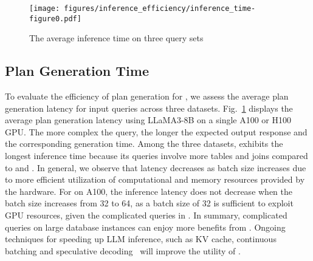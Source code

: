 \begin{figure}
  \centering
 \texttt{[image: figures/inference\_efficiency/inference\_time-figure0.pdf]}
  \caption{The average inference time on three query sets}
\label{fig:exp:inference_efficiency}
    \vspace{-2.5ex}
\end{figure}

\subsection{Plan Generation Time}
\label{sec:exp:time}
To evaluate the efficiency of plan generation for \LLMQO, we assess the average plan generation latency for input queries across three datasets. 
Fig.~\ref{fig:exp:inference_efficiency} displays the average plan generation latency using LLaMA3-8B on a single A100 or H100 GPU.
The more complex the query, the longer the expected output response and the corresponding generation time.
Among the three datasets, \dsb exhibits the longest inference time because its queries involve more tables and joins compared to \imdb and \job.
In general, we observe that latency decreases as batch size increases due to more efficient utilization of computational and memory resources provided by the hardware.
For \dsb on A100, the inference latency does not decrease when the batch size increases from 32 to 64, as a batch size of 32 is sufficient to exploit GPU resources, given the complicated queries in \dsb.
In summary, complicated queries on large database instances can enjoy more benefits from \LLMQO. Ongoing techniques for speeding up LLM inference, such as KV cache, continuous batching and speculative decoding~\cite{DBLP:conf/icml/LeviathanKM23} will improve the utility of \LLMQO.







